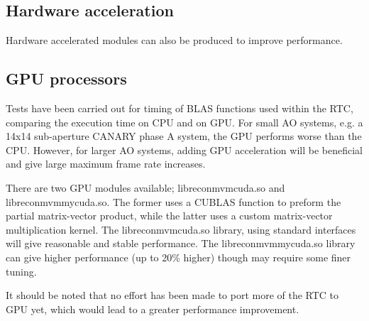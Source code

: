 \documentclass[a4,10pt]{article}
\begin{document}
\subsection{Hardware acceleration}
Hardware accelerated modules can also be produced to improve performance.


\subsection{GPU processors}
Tests have been carried out for timing of BLAS functions used within
the RTC, comparing the execution time on CPU and on GPU.  For small AO
systems, e.g. a 14x14 sub-aperture CANARY phase A system, the GPU performs
worse than the CPU.  However, for larger AO systems, adding GPU
acceleration will be beneficial and give large maximum frame rate increases.

There are two GPU modules available; libreconmvmcuda.so and
libreconmvmmycuda.so.  The former uses a CUBLAS function to preform
the partial matrix-vector product, while the latter uses a custom
matrix-vector multiplication kernel.  The libreconmvmcuda.so library,
using standard interfaces will give reasonable and stable
performance.  The libreconmvmmycuda.so library can give higher
performance (up to 20\% higher) though may require some finer tuning.  

It should be noted that no effort has been made to port more of the
RTC to GPU yet, which would lead to a greater performance improvement.
\end{document}

